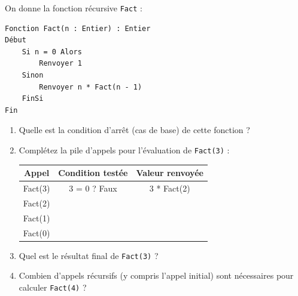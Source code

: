 \documentclass[11pt]{article}
\begin{document}
\begin{exercice}
On donne la fonction récursive \texttt{Fact} :
\begin{verbatim}
Fonction Fact(n : Entier) : Entier
Début
    Si n = 0 Alors
        Renvoyer 1
    Sinon
        Renvoyer n * Fact(n - 1)
    FinSi
Fin
\end{verbatim}
\begin{enumerate}
    \item Quelle est la condition d'arrêt (cas de base) de cette fonction ?
    \item Complétez la pile d'appels pour l'évaluation de \texttt{Fact(3)} :
    \begin{center}
    \begin{tabular}{|c|c|c|}
    \hline
    \textbf{Appel} & \textbf{Condition testée} & \textbf{Valeur renvoyée} \\
    \hline
    Fact(3) & 3 = 0 ? Faux & 3 * Fact(2) \\
    \hline
    Fact(2) & & \\
    \hline
    Fact(1) & & \\
    \hline
    Fact(0) & & \\
    \hline
    \end{tabular}
    \end{center}
    \item Quel est le résultat final de \texttt{Fact(3)} ?
    \item Combien d'appels récursifs (y compris l'appel initial) sont nécessaires pour calculer \texttt{Fact(4)} ?
\end{enumerate}
\end{exercice}
\end{document}
